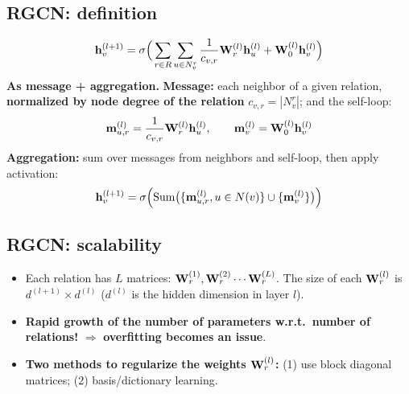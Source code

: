 \subsection{RGCN: definition}\label{sec:lec09-rgcndef}

\begin{definition}\label{def:lec09-rgcn}
  \begin{equation}\label{eq:lec09-rgcn}
    \mathbf{h}_v^{(l+1)} = \sigma\Big(\sum_{r\in R}\sum_{u\in N_v^r}\frac{1}{c_{v,r}}
      \mathbf{W}_r^{(l)}\mathbf{h}_u^{(l)} + \mathbf{W}_0^{(l)}\mathbf{h}_v^{(l)}\Big)
  \end{equation}
  \textbf{As message + aggregation.} \textbf{Message:} each neighbor of a given
  relation, \textbf{normalized by node degree of the relation}
  $c_{v,r}=|N_v^r|$; and the self-loop:
  \begin{equation}\label{eq:lec09-rgcn-msg}
    \mathbf{m}_{u,r}^{(l)} = \frac{1}{c_{v,r}}\mathbf{W}_r^{(l)}\mathbf{h}_u^{(l)},
    \qquad
    \mathbf{m}_v^{(l)} = \mathbf{W}_0^{(l)}\mathbf{h}_v^{(l)}
  \end{equation}
  \textbf{Aggregation:} sum over messages from neighbors and self-loop, then
  apply activation:
  \begin{equation}\label{eq:lec09-rgcn-agg}
    \mathbf{h}_v^{(l+1)} = \sigma\Big(\mathrm{Sum}\big(\{\mathbf{m}_{u,r}^{(l)}, u\in N(v)\}
      \cup\{\mathbf{m}_v^{(l)}\}\big)\Big)
  \end{equation}
\end{definition}

\subsection{RGCN: scalability}\label{sec:lec09-scal}

\begin{itemize}
  \item Each relation has $L$ matrices: $\mathbf{W}_r^{(1)},\mathbf{W}_r^{(2)}\cdots\mathbf{W}_r^{(L)}$.
    The size of each $\mathbf{W}_r^{(l)}$ is $d^{(l+1)}\times d^{(l)}$ ($d^{(l)}$ is the
    hidden dimension in layer $l$).
  \item \textbf{Rapid growth of the number of parameters w.r.t.\ number of
    relations!} $\Rightarrow$ \textbf{overfitting becomes an issue}.
  \item \textbf{Two methods to regularize the weights $\mathbf{W}_r^{(l)}$:} (1) use
    block diagonal matrices; (2) basis/dictionary learning.
\end{itemize}


